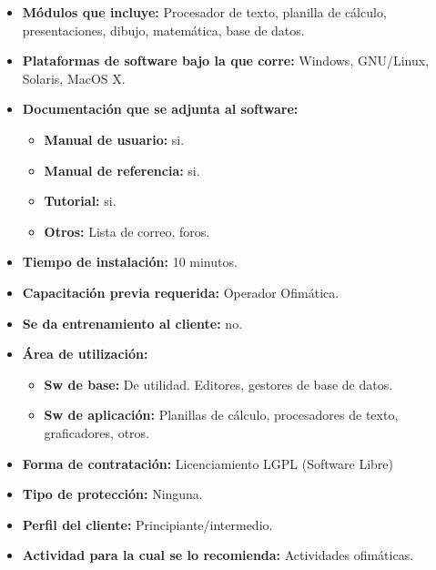 \begin{itemize}
  \item \textbf{Módulos que incluye:} Procesador de texto, planilla de cálculo, presentaciones, dibujo, matemática, base de datos.
  \item \textbf{Plataformas de software bajo la que corre:} Windows, GNU/Linux, Solaris, MacOS X.

  \item \textbf{Documentación que se adjunta al software:}
    \begin{itemize}
      \item \textbf{Manual de usuario:} si.
      \item \textbf{Manual de referencia:} si.
      \item \textbf{Tutorial:} si.
      \item \textbf{Otros:} Lista de correo, foros.
    \end{itemize}

  \item \textbf{Tiempo de instalación:} 10 minutos.
  \item \textbf{Capacitación previa requerida:} Operador Ofimática.
  \item \textbf{Se da entrenamiento al cliente:} no.

  \item \textbf{Área de utilización:}
    \begin{itemize}
      \item \textbf{Sw de base:} De utilidad. Editores, gestores de base de datos.
      \item \textbf{Sw de aplicación:} Planillas de cálculo, procesadores de texto, graficadores, otros.
    \end{itemize}

  \item \textbf{Forma de contratación:} Licenciamiento LGPL (Software Libre)
  \item \textbf{Tipo de protección:} Ninguna.
  \item \textbf{Perfil del cliente:} Principiante/intermedio.
  \item \textbf{Actividad para la cual se lo recomienda:} Actividades ofimáticas.
\end{itemize}

